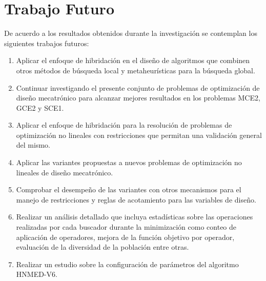  \section{Trabajo Futuro}
 De acuerdo a los resultados obtenidos durante la investigación se contemplan los siguientes trabajos futuros:
 \begin{enumerate}
    \item Aplicar el enfoque de hibridación en el diseño de algoritmos que combinen otros métodos de búsqueda local y metaheurísticas para la búsqueda global. 
    \item Continuar investigando el presente conjunto de problemas de optimización de diseño mecatrónico para alcanzar mejores resultados en los problemas MCE2, GCE2 y SCE1.
    \item Aplicar el enfoque de hibridación para la resolución de problemas de optimización no lineales con restricciones que permitan una validación general del mismo. 
    \item Aplicar las variantes propuestas a nuevos problemas de optimización no lineales de diseño mecatrónico.
    \item Comprobar el desempeño de las variantes con otros mecanismos para el manejo de restricciones y reglas de acotamiento para las variables de diseño.
    \item Realizar un análisis detallado que incluya estadísticas sobre las operaciones realizadas por cada buscador durante la minimización como  conteo de aplicación de operadores, mejora de la función objetivo por operador, evaluación de la diversidad de la población entre otras.
    \item Realizar un estudio sobre la configuración de parámetros del algoritmo HNMED-V6.
 \end{enumerate}
 